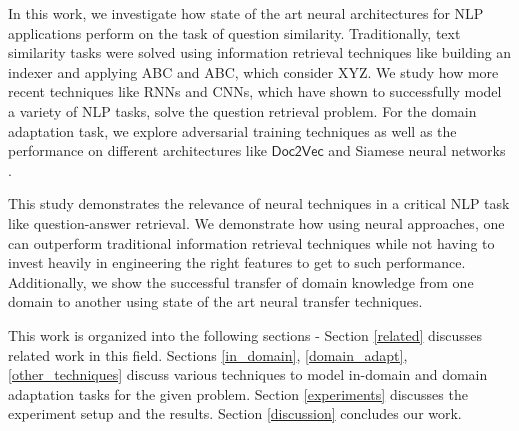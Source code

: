\documentclass{sigkddExp}
\begin{document}
In this work, we investigate how state of the art neural architectures for NLP applications perform on the task of question similarity. Traditionally, text similarity tasks were solved using information retrieval techniques like building an indexer and applying {\color{red}ABC and ABC, which consider XYZ}. We study how more recent techniques like RNNs and CNNs, which have shown to successfully model a variety of NLP tasks, solve the question retrieval problem. For the domain adaptation task, we explore adversarial training techniques \cite{ganin2015unsupervised, lei2015semi} as well as the performance on different architectures like $\textsf{Doc2Vec}$ \cite{doc2vec1} and Siamese neural networks \cite{siamese}.

This study demonstrates the relevance of neural techniques in a critical NLP task like question-answer retrieval. We demonstrate how using neural approaches, one can outperform traditional information retrieval techniques while not having to invest heavily in engineering the right features to get to such performance. Additionally, we show the successful transfer of domain knowledge from one domain to another using state of the art neural transfer techniques.

This work is organized into the following sections - Section \ref{related} discusses related work in this field. Sections \ref{in_domain}, \ref{domain_adapt},  \ref{other_techniques} discuss various techniques to model in-domain and domain adaptation tasks for the given problem. Section \ref{experiments} discusses the experiment setup and the results. Section \ref{discussion} concludes our work.
\end{document}
